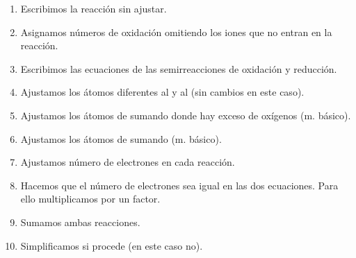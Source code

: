 \begin{frame}
	\begin{enumerate}
		\item<1-> Escribimos la reacción sin ajustar.
		\item<2-> Asignamos números de oxidación omitiendo los iones que no entran en la reacción.
		\item<3-> Escribimos las ecuaciones de las semirreacciones de oxidación y reducción.
		\item<4-> Ajustamos los átomos diferentes al  y al  (sin cambios en este caso).
		\item<5-> Ajustamos los átomos de  sumando  donde hay exceso de oxígenos (m. básico).
		\item<6-> Ajustamos los átomos de  sumando  (m. básico).
		\item<7-> Ajustamos número de electrones en cada reacción.
		\item<8-> Hacemos que el número de electrones sea igual en las dos ecuaciones. Para ello multiplicamos por un factor.
		\item<10-> Sumamos ambas reacciones.
		\item<10-> Simplificamos si procede (en este caso no).
	\end{enumerate}
\end{frame}

